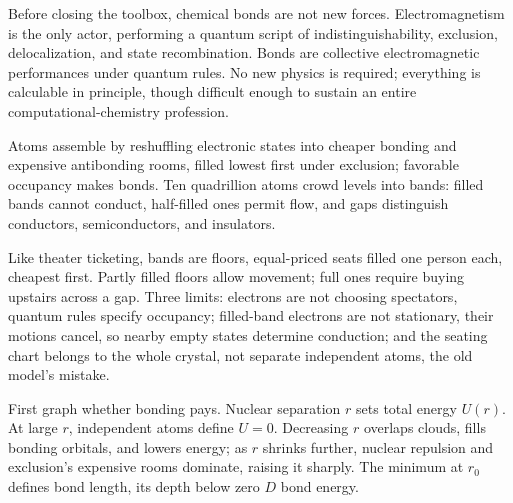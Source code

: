 Before closing the toolbox, chemical bonds are not new forces. Electromagnetism is the only actor, performing a quantum script of indistinguishability, exclusion, delocalization, and state recombination. Bonds are collective electromagnetic performances under quantum rules. No new physics is required; everything is calculable in principle, though difficult enough to sustain an entire computational-chemistry profession.


\begin{oneline}
Atoms assemble by reshuffling electronic states into cheaper bonding and expensive antibonding rooms, filled lowest first under exclusion; favorable occupancy makes bonds. Ten quadrillion atoms crowd levels into bands: filled bands cannot conduct, half-filled ones permit flow, and gaps distinguish conductors, semiconductors, and insulators.
\end{oneline}

Like theater ticketing, bands are floors, equal-priced seats filled one person each, cheapest first. Partly filled floors allow movement; full ones require buying upstairs across a gap. Three limits: electrons are not choosing spectators, quantum rules specify occupancy; filled-band electrons are not stationary, their motions cancel, so nearby empty states determine conduction; and the seating chart belongs to the whole crystal, not separate independent atoms, the old model's mistake.


First graph whether bonding pays. Nuclear separation \(r\) sets total energy \(U(r)\). At large \(r\), independent atoms define \(U=0\). Decreasing \(r\) overlaps clouds, fills bonding orbitals, and lowers energy; as \(r\) shrinks further, nuclear repulsion and exclusion's expensive rooms dominate, raising it sharply. The minimum at \(r_0\) defines bond length, its depth below zero \(D\) bond energy.

\begin{figure}[htbp]
\centering
{}
\end{figure}

